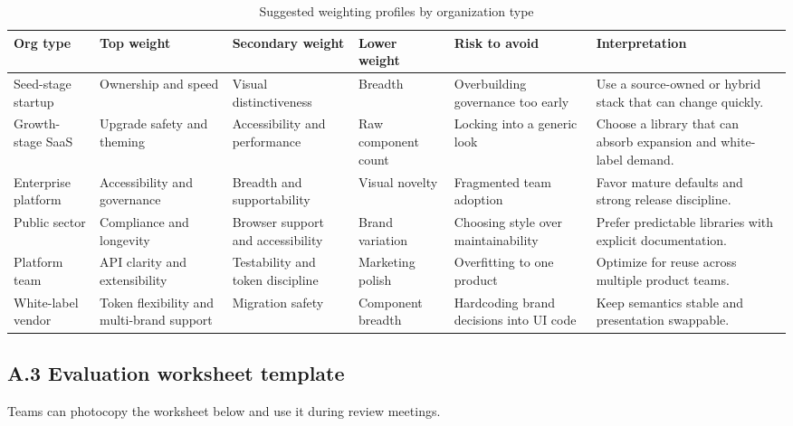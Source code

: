 \begin{table}[htbp]
  \centering
  \caption{Suggested weighting profiles by organization type}
  \begin{tabularx}{\textwidth}{@{}p{}p{}p{}p{}p{}Y@{}}
    \toprule
    \textbf{Org type} & \textbf{Top weight} & \textbf{Secondary weight} & \textbf{Lower weight} & \textbf{Risk to avoid} & \textbf{Interpretation} \\
    \midrule
    Seed-stage startup & Ownership and speed & Visual distinctiveness & Breadth & Overbuilding governance too early & Use a source-owned or hybrid stack that can change quickly. \\
    Growth-stage SaaS & Upgrade safety and theming & Accessibility and performance & Raw component count & Locking into a generic look & Choose a library that can absorb expansion and white-label demand. \\
    Enterprise platform & Accessibility and governance & Breadth and supportability & Visual novelty & Fragmented team adoption & Favor mature defaults and strong release discipline. \\
    Public sector & Compliance and longevity & Browser support and accessibility & Brand variation & Choosing style over maintainability & Prefer predictable libraries with explicit documentation. \\
    Platform team & API clarity and extensibility & Testability and token discipline & Marketing polish & Overfitting to one product & Optimize for reuse across multiple product teams. \\
    White-label vendor & Token flexibility and multi-brand support & Migration safety & Component breadth & Hardcoding brand decisions into UI code & Keep semantics stable and presentation swappable. \\
    \bottomrule
  \end{tabularx}
\end{table}

\subsection*{A.3 Evaluation worksheet template}
Teams can photocopy the worksheet below and use it during review meetings.

